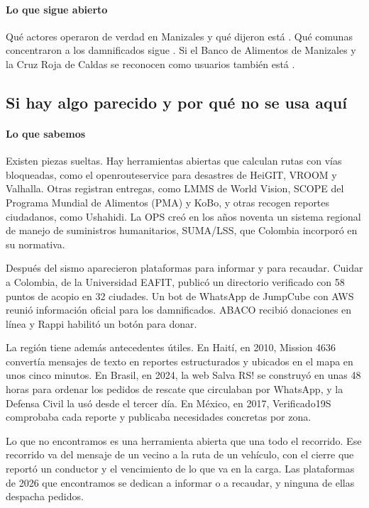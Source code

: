 \paragraph{Lo que sigue abierto} Qué actores operaron de verdad en Manizales y qué dijeron está \eninvestigacion. Qué comunas concentraron a los damnificados sigue \pendiente. Si el Banco de Alimentos de Manizales y la Cruz Roja de Caldas se reconocen como usuarios también está \pendiente.

\subsection{Si hay algo parecido y por qué no se usa aquí}

\paragraph{Lo que sabemos} Existen piezas sueltas. Hay herramientas abiertas que calculan rutas con vías bloqueadas, como el openrouteservice para desastres de HeiGIT, VROOM y Valhalla. Otras registran entregas, como LMMS de World Vision, SCOPE del Programa Mundial de Alimentos (PMA) y KoBo, y otras recogen reportes ciudadanos, como Ushahidi. La OPS creó en los años noventa un sistema regional de manejo de suministros humanitarios, SUMA/LSS, que Colombia incorporó en su normativa.

Después del sismo aparecieron plataformas para informar y para recaudar. Cuidar a Colombia, de la Universidad EAFIT, publicó un directorio verificado con 58 puntos de acopio en 32 ciudades. Un bot de WhatsApp de JumpCube con AWS reunió información oficial para los damnificados. ABACO recibió donaciones en línea y Rappi habilitó un botón para donar.

La región tiene además antecedentes útiles. En Haití, en 2010, Mission 4636 convertía mensajes de texto en reportes estructurados y ubicados en el mapa en unos cinco minutos. En Brasil, en 2024, la web Salva RS! se construyó en unas 48 horas para ordenar los pedidos de rescate que circulaban por WhatsApp, y la Defensa Civil la usó desde el tercer día. En México, en 2017, Verificado19S comprobaba cada reporte y publicaba necesidades concretas por zona.

Lo que no encontramos es una herramienta abierta que una todo el recorrido. Ese recorrido va del mensaje de un vecino a la ruta de un vehículo, con el cierre que reportó un conductor y el vencimiento de lo que va en la carga. Las plataformas de 2026 que encontramos se dedican a informar o a recaudar, y ninguna de ellas despacha pedidos.

